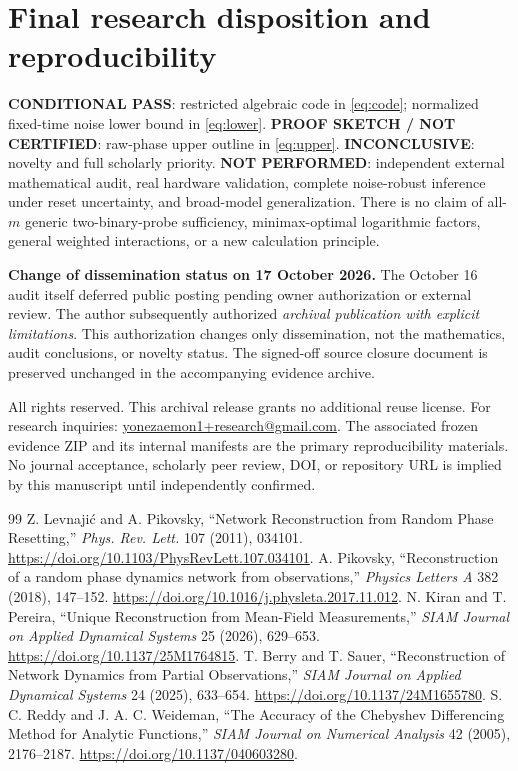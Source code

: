 \documentclass[11pt,a4paper]{article}
\begin{document}
\section{Final research disposition and reproducibility}
\textbf{CONDITIONAL PASS}: restricted algebraic code in \eqref{eq:code}; normalized fixed-time noise lower bound in \eqref{eq:lower}. \textbf{PROOF SKETCH / NOT CERTIFIED}: raw-phase upper outline in \eqref{eq:upper}. \textbf{INCONCLUSIVE}: novelty and full scholarly priority. \textbf{NOT PERFORMED}: independent external mathematical audit, real hardware validation, complete noise-robust inference under reset uncertainty, and broad-model generalization. There is no claim of all-$m$ generic two-binary-probe sufficiency, minimax-optimal logarithmic factors, general weighted interactions, or a new calculation principle.

\textbf{Change of dissemination status on 17 October 2026.} The October 16 audit itself deferred public posting pending owner authorization or external review. The author subsequently authorized \emph{archival publication with explicit limitations}. This authorization changes only dissemination, not the mathematics, audit conclusions, or novelty status. The signed-off source closure document is preserved unchanged in the accompanying evidence archive.

All rights reserved. This archival release grants no additional reuse license. For research inquiries: \href{mailto:yonezaemon1+research@gmail.com}{yonezaemon1+research@gmail.com}. The associated frozen evidence ZIP and its internal manifests are the primary reproducibility materials. No journal acceptance, scholarly peer review, DOI, or repository URL is implied by this manuscript until independently confirmed.
\begin{thebibliography}{99}
 Z. Levnaji\'{c} and A. Pikovsky, ``Network Reconstruction from Random Phase Resetting,'' \emph{Phys. Rev. Lett.} 107 (2011), 034101. \url{https://doi.org/10.1103/PhysRevLett.107.034101}.
 A. Pikovsky, ``Reconstruction of a random phase dynamics network from observations,'' \emph{Physics Letters A} 382 (2018), 147--152. \url{https://doi.org/10.1016/j.physleta.2017.11.012}.
 N. Kiran and T. Pereira, ``Unique Reconstruction from Mean-Field Measurements,'' \emph{SIAM Journal on Applied Dynamical Systems} 25 (2026), 629--653. \url{https://doi.org/10.1137/25M1764815}.
 T. Berry and T. Sauer, ``Reconstruction of Network Dynamics from Partial Observations,'' \emph{SIAM Journal on Applied Dynamical Systems} 24 (2025), 633--654. \url{https://doi.org/10.1137/24M1655780}.
 S. C. Reddy and J. A. C. Weideman, ``The Accuracy of the Chebyshev Differencing Method for Analytic Functions,'' \emph{SIAM Journal on Numerical Analysis} 42 (2005), 2176--2187. \url{https://doi.org/10.1137/040603280}.
\end{thebibliography}
\end{document}
